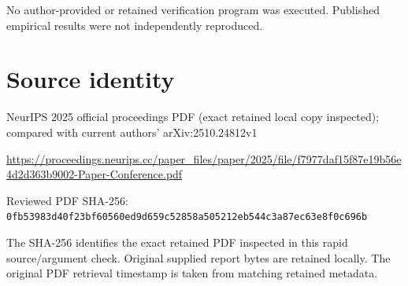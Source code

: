 \documentclass[11pt]{article}
\begin{document}
No author-provided or retained verification program was executed. Published empirical results were not independently reproduced.\par

\section*{Source identity}

NeurIPS 2025 official proceedings PDF (exact retained local copy inspected); compared with current authors’ arXiv:2510.24812v1

\url{https://proceedings.neurips.cc/paper_files/paper/2025/file/f7977daf15f87e19b56e4d2d363b9002-Paper-Conference.pdf}

Reviewed PDF SHA-256: \nolinkurl{0fb53983d40f23bf60560ed9d659c52858a505212eb544c3a87ec63e8f0c696b}

The SHA-256 identifies the exact retained PDF inspected in this rapid source/argument check. Original supplied report bytes are retained locally. The original PDF retrieval timestamp is taken from matching retained metadata.
\end{document}
